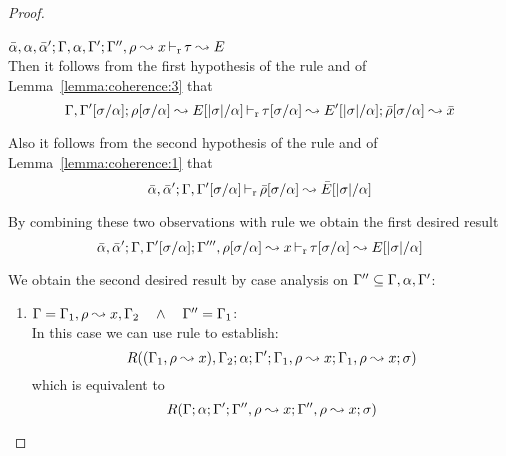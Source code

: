\begin{proof}
\begin{description}
\setlength{\itemsep}{1em}
\item[\fbox{\texttt{(L-RuleMatch)}}]\quad$
  \bar{\alpha},\alpha,\bar{\alpha}'; \Gamma,\alpha,\Gamma'; \Gamma'',\rho \leadsto x \mathop{\vdash_{\mathrm{r}}} \tau \leadsto E
$ \ \\
  Then it follows from the first hypothesis of the rule and of Lemma~\ref{lemma:coherence:3}
  that
\begin{equation*}
\Gamma,\Gamma'[\sigma/\alpha]; \rho[\sigma/\alpha] \leadsto E[|\sigma|/\alpha] \mathop{\vdash_{\mathrm{r}}} \tau[\sigma/\alpha] \leadsto E'[|\sigma|/\alpha]; \bar{\rho}[\sigma/\alpha] \leadsto \bar{x}
\end{equation*}

  Also it follows from the second hypothesis of the rule and of Lemma~\ref{lemma:coherence:1}
  that
\begin{equation*}
  \bar{\alpha},\bar{\alpha}'; \Gamma,\Gamma'[\sigma/\alpha] \mathop{\vdash_{\mathrm{r}}} \bar{\rho}[\sigma/\alpha] \leadsto \bar{E}[|\sigma|/\alpha]
\end{equation*}

  By combining these two observations with rule  we obtain the first desired result
\begin{equation*}
  \bar{\alpha},\bar{\alpha}'; \Gamma,\Gamma'[\sigma/\alpha]; \Gamma''',\rho[\sigma/\alpha] \leadsto x \mathop{\vdash_{\mathrm{r}}} \tau[\sigma/\alpha] \leadsto E[|\sigma|/\alpha]
\end{equation*}
  
  We obtain the second desired result by case analysis on $\Gamma'' \subseteq \Gamma,\alpha,\Gamma'$:
  \begin{enumerate}
  \item $\Gamma = \Gamma_1,\rho \leadsto x,\Gamma_2 \quad\wedge\quad \Gamma'' = \Gamma_1$: \\
  In this case we can use rule  to establish:
\begin{equation*}
  R((\Gamma_1,\rho \leadsto x),\Gamma_2;\alpha;\Gamma';\Gamma_1,\rho \leadsto x;\Gamma_1,\rho \leadsto x;\sigma)
\end{equation*}
  which is equivalent to
\begin{equation*}
  R(\Gamma;\alpha;\Gamma';\Gamma'',\rho \leadsto x;\Gamma'',\rho \leadsto x;\sigma)
\end{equation*}


\end{enumerate}
\end{description}
\end{proof}
